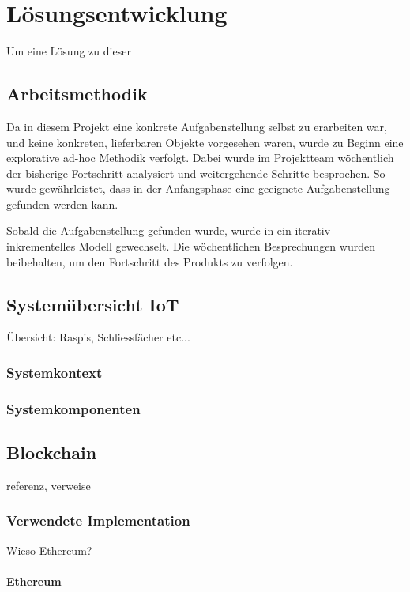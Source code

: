 \chapter{Lösungsentwicklung}
\label{cha:Lösungsentwicklung}
Um eine Lösung zu dieser 

\section{Arbeitsmethodik}
Da in diesem Projekt eine konkrete Aufgabenstellung selbst zu erarbeiten war, und keine konkreten, lieferbaren Objekte vorgesehen waren, wurde zu Beginn eine explorative ad-hoc Methodik verfolgt. Dabei wurde im Projektteam wöchentlich der bisherige Fortschritt analysiert und weitergehende Schritte besprochen. So wurde gewährleistet, dass in der Anfangsphase eine geeignete Aufgabenstellung gefunden werden kann.
\par
Sobald die Aufgabenstellung gefunden wurde, wurde in ein iterativ- inkrementelles Modell gewechselt. Die wöchentlichen Besprechungen wurden beibehalten, um den Fortschritt des Produkts zu verfolgen.

\section{Systemübersicht IoT}
\label{sec:Setup_IoT}
Übersicht: Raspis, Schliessfächer etc...
\subsection{Systemkontext}

\subsection{Systemkomponenten}




\section{Blockchain}
\label{sec:Blockchain}
referenz, verweise

\subsection{Verwendete Implementation}
Wieso Ethereum?

\subsubsection{Ethereum}
